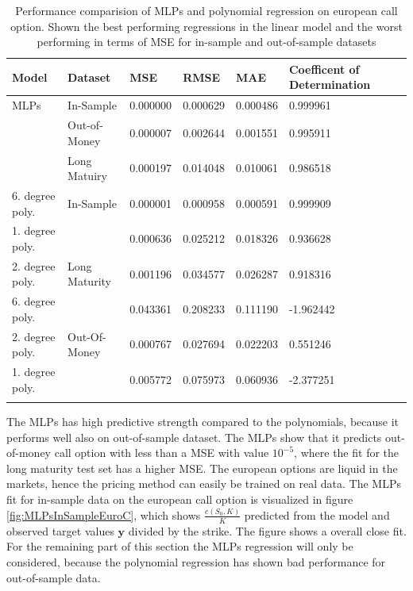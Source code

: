 \begin{table}[th]
\caption{Performance comparision of MLPs and polynomial regression on european call option. Shown the best performing regressions in the linear model and the worst performing in terms of MSE for in-sample and out-of-sample datasets}
\label{tab:ComparePolyWithMLPS}
\centering
\begin{tabular}{l l l l l l l }
\toprule
\textbf{Model} & \textbf{Dataset} & \textbf{MSE} & \textbf{RMSE} & \textbf{MAE} & \textbf{Coefficent of Determination} \\
\midrule
MLPs & In-Sample & 0.000000 & 0.000629 & 0.000486 & 0.999961\\
& Out-of-Money & 0.000007 & 0.002644 & 0.001551 & 0.995911\\
& Long Matuiry & 0.000197 & 0.014048 & 0.010061 & 0.986518\\
6. degree poly. & In-Sample & 0.000001 & 0.000958 & 0.000591 & 0.999909\\
1. degree poly. &  & 0.000636 & 0.025212 & 0.018326 & 0.936628\\
2. degree poly. & Long Maturity & 0.001196 & 0.034577 & 0.026287 & 0.918316\\
6. degree poly. &  & 0.043361 & 0.208233 & 0.111190 & -1.962442\\
2. degree poly. & Out-Of-Money & 0.000767 & 0.027694 & 0.022203 & 0.551246\\
1. degree poly. &  & 0.005772 & 0.075973 & 0.060936 & -2.377251\\
\bottomrule\\
\end{tabular}
\end{table}

The MLPs has high predictive strength compared to the polynomials, because it performs well also on out-of-sample dataset. The MLPs show that it predicts out-of-money call option with less than a MSE with value $10^{-5}$, where the fit for the long maturity test set has a higher MSE. The european options are liquid in the markets, hence the pricing method can easily be trained on real data. The MLPs fit for in-sample data on the european call option is visualized in figure \ref{fig:MLPsInSampleEuroC}, which shows $\frac{c(S_0,K)}{K}$ predicted from the model and observed target values $\bm{y}$ divided by the strike. The figure shows a overall close fit. For the remaining part of this section the MLPs regression will only be considered, because the polynomial regression has shown bad performance for out-of-sample data.


